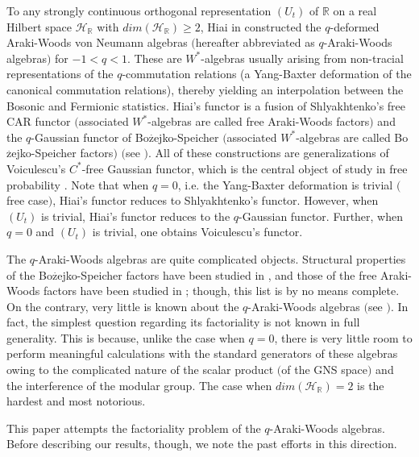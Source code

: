 \documentclass[12pt, a4paper,reqno]{amsart}
\theoremstyle{definition}
\renewcommand{\geq}{\geqslant}
\def\R{\mathbb R}
\newcommand{\CH}{\mathcal{H}}
\begin{document}
To any strongly continuous orthogonal representation $(U_t)$ of $\R$ on a real Hilbert space $\CH_\R$ with $dim(\CH_\R)\geq 2$, Hiai in \cite{Hiai} constructed the $q$-deformed Araki-Woods von Neumann algebras $($hereafter abbreviated as $q$-Araki-Woods algebras$)$ for $-1< q< 1$. These are $W^{\ast}$-algebras usually arising from non-tracial representations of the $q$-commutation relations (a Yang-Baxter deformation of the canonical commutation relations), thereby yielding an interpolation between the Bosonic and Fermionic statistics. Hiai's functor is a fusion of Shlyakhtenko's free CAR functor \cite{Shlyakhtenko} $($associated $W^*$-algebras are called free Araki-Woods factors$)$ and the $q$-Gaussian functor of Bo$\overset{.}{\text{z}}$ejko-Speicher $($associated $W^{*}$-algebras are called Bo$\overset{.}{\text{z}}$ejko-Speicher factors$)$ $($see \cite{BS}$)$. All of these constructions are generalizations of  Voiculescu's $C^*$-free Gaussian functor, which is the central object of study in free probability  \cite{DVN}. Note that when $q=0$, i.e. the Yang-Baxter deformation is trivial $($free case$)$, Hiai's functor reduces to Shlyakhtenko's functor. However, when $(U_t)$ is trivial, Hiai's functor reduces to the $q$-Gaussian functor. Further, when $q=0$ and $(U_t)$ is trivial, one obtains Voiculescu's functor. 

The $q$-Araki-Woods algebras are quite complicated objects. Structural properties of the Bo$\overset{.}{\text{z}}$ejko-Speicher factors have been studied in \cite{avsec,BS,BKS,Dab14,ER,nou,sniady,Shlyakhtenko2,Shlyakhtenko3}, and those of the free Araki-Woods factors have been studied in \cite{Ho09, HR11,BHV15}; though, this list is by no means complete. On the contrary, very little is known about the $q$-Araki-Woods algebras $($see \cite{nou,Nou-Araki,Was}$)$. In fact, the simplest question regarding its factoriality is not known in full generality. This is because, unlike the case when $q=0$, there is very little room to perform meaningful calculations with the standard generators of these algebras owing to the complicated nature of the scalar product $($of the GNS space$)$ and the interference of the modular group. The case when $dim(\CH_\R)=2$ is the hardest and most notorious.  

This paper attempts the factoriality problem of the $q$-Araki-Woods algebras. Before describing our results, though, we note the past efforts in this direction. 
\end{document}
